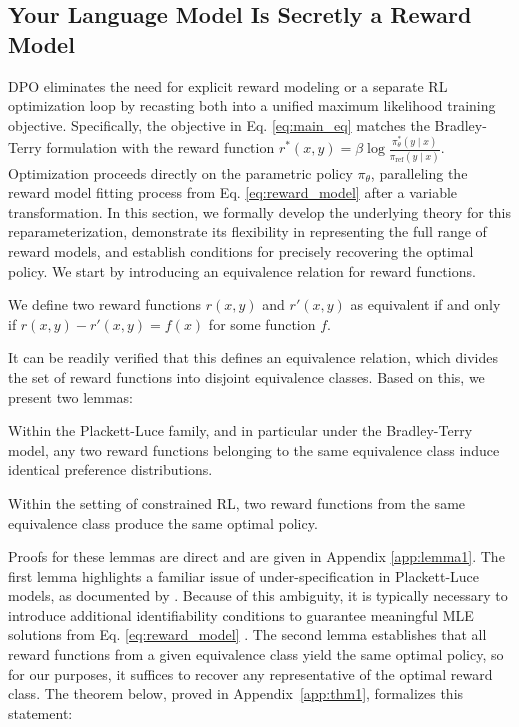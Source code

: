 \label{sec:theory}

\subsection{Your Language Model Is Secretly a Reward Model}
DPO eliminates the need for explicit reward modeling or a separate RL optimization loop by recasting both into a unified maximum likelihood training objective. Specifically, the objective in Eq. \ref{eq:main_eq} matches the Bradley-Terry formulation with the reward function $r^*(x, y) = \beta \log\frac{\pi^*_\theta(y \mid x)}{\pi_\text{ref}(y \mid x)}$. Optimization proceeds directly on the parametric policy $\pi_\theta$, paralleling the reward model fitting process from Eq. \ref{eq:reward_model} after a variable transformation. In this section, we formally develop the underlying theory for this reparameterization, demonstrate its flexibility in representing the full range of reward models, and establish conditions for precisely recovering the optimal policy. We start by introducing an equivalence relation for reward functions.

\begin{definition}
We define two reward functions $r(x, y)$ and $r'(x, y)$ as equivalent if and only if ${r(x, y)-r'(x, y) = f(x)}$ for some function $f$.
\end{definition}

It can be readily verified that this defines an equivalence relation, which divides the set of reward functions into disjoint equivalence classes. Based on this, we present two lemmas:

\begin{lemma}\label{lemma:same_prefrence} Within the Plackett-Luce family, and in particular under the Bradley-Terry model, any two reward functions belonging to the same equivalence class induce identical preference distributions.
\end{lemma}

\begin{lemma}\label{lemma:same_policy}
    Within the setting of constrained RL, two reward functions from the same equivalence class produce the same optimal policy.
\end{lemma}

Proofs for these lemmas are direct and are given in Appendix \ref{app:lemma1}. The first lemma highlights a familiar issue of under-specification in Plackett-Luce models, as documented by \cite{plackett1975analysis}. Because of this ambiguity, it is typically necessary to introduce additional identifiability conditions to guarantee meaningful MLE solutions from Eq. \ref{eq:reward_model} \cite{bong2022generalized}. The second lemma establishes that all reward functions from a given equivalence class yield the same optimal policy, so for our purposes, it suffices to recover any representative of the optimal reward class. The theorem below, proved in Appendix~\ref{app:thm1}, formalizes this statement:


